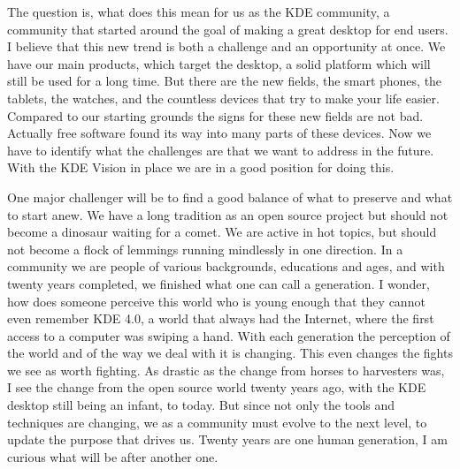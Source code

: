 The question is, what does this mean for us as the KDE community, a community that started around the goal of making a great desktop for end users. I believe that this new trend is both a challenge and an opportunity at once. We have our main products, which target the desktop, a solid platform which will still be used for a long time. But there are the new fields, the smart phones, the tablets, the watches, and the countless devices that try to make your life easier. Compared to our starting grounds the signs for these new fields are not bad. Actually free software found its way into many parts of these devices. Now we have to identify what the challenges are that we want to address in the future. With the KDE Vision in place we are in a good position for doing this.

One major challenger will be to find a good balance of what to preserve and what to start anew. We have a long tradition as an open source project but should not become a dinosaur waiting for a comet. We are active in hot topics, but should not become a flock of lemmings running mindlessly in one direction. In a community we are people of various backgrounds, educations and ages, and with twenty years completed, we finished what one can call a generation. I wonder, how does someone perceive this world who is young enough that they cannot even remember KDE 4.0, a world that always had the Internet, where the first access to a computer was swiping a hand. With each generation the perception of the world and of the way we deal with it is changing. This even changes the fights we see as worth fighting. As drastic as the change from horses to harvesters was, I see the change from the open source world twenty years ago, with the KDE desktop still being an infant, to today. But since not only the tools and techniques are changing, we as a community must evolve to the next level, to update the purpose that drives us. Twenty years are one human generation, I am curious what will be after another one.
